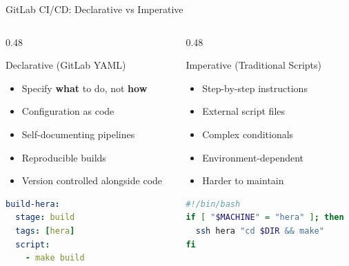 \documentclass[aspectratio=169]{beamer}
\begin{document}
\begin{frame}[fragile]{GitLab CI/CD: Declarative vs Imperative}

\begin{columns}[T]
\begin{column}{0.48\textwidth}

\begin{block}{\textcolor{noaablue}{Declarative (GitLab YAML)}}
\begin{itemize}
    \item Specify \textbf{what} to do, not \textbf{how}
    \item Configuration as code
    \item Self-documenting pipelines
    \item Reproducible builds
    \item Version controlled alongside code
\end{itemize}
\end{block}

\vspace{0.2cm}
\begin{lstlisting}[language=yaml,basicstyle=\ttfamily\tiny]
build-hera:
  stage: build
  tags: [hera]
  script:
    - make build
\end{lstlisting}
\end{column}

\begin{column}{0.48\textwidth}

\begin{block}{\textcolor{codegray}{Imperative (Traditional Scripts)}}
\begin{itemize}
    \item Step-by-step instructions
    \item External script files
    \item Complex conditionals
    \item Environment-dependent
    \item Harder to maintain
\end{itemize}
\end{block}

\vspace{0.2cm}
\begin{lstlisting}[language=bash,basicstyle=\ttfamily\tiny]
#!/bin/bash
if [ "$MACHINE" = "hera" ]; then
  ssh hera "cd $DIR && make"
fi
\end{lstlisting}
\end{column}
\end{columns}

\vspace{0.3cm}
\begin{center}
\end{center}

\end{frame}
\end{document}
